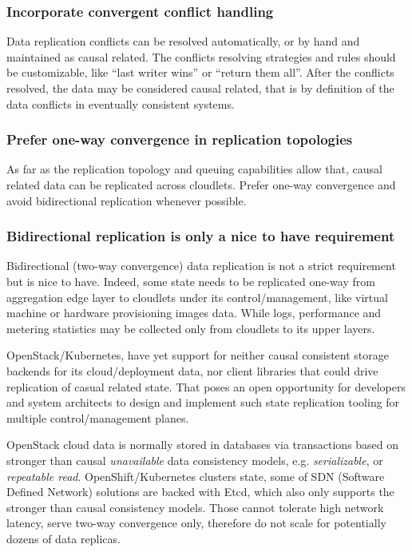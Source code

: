 \documentclass[conference]{IEEEtran}
\begin{document}
\subsubsection{Incorporate convergent conflict handling\cite{b1}}
Data replication conflicts can be resolved automatically, or by hand and
maintained as causal related. The conflicts resolving strategies and rules
should be customizable, like ``last writer wins'' or ``return them all''. After
the conflicts resolved, the data may be considered causal related, that is by
definition\cite{b1} of the data conflicts in eventually consistent systems.

\subsubsection{Prefer one-way convergence in replication topologies}
As far as the replication topology and queuing capabilities allow
that, causal related data can be replicated across cloudlets. Prefer one-way
convergence and avoid bidirectional replication whenever possible.

\subsubsection{Bidirectional replication is only a nice to have requirement}
Bidirectional (two-way convergence) data replication is not a strict
requirement but is nice to have. Indeed, some state needs to be replicated
one-way from aggregation edge layer to cloudlets under its control/management,
like virtual machine or hardware provisioning images data. While logs,
performance and metering statistics may be collected only from cloudlets to its
upper layers.

OpenStack/Kubernetes, have yet support for neither causal consistent storage
backends for its cloud/deployment data, nor client libraries that could drive
replication of casual related state. That poses an open opportunity for
developers and system architects to design and implement such state replication
tooling for multiple control/management planes.

OpenStack cloud data is normally stored in databases via transactions based on
stronger than causal \textit{unavailable}\cite{b4} data consistency models,
e.g. \textit{serializable}\cite{b4}, or \textit{repeatable read}\cite{b4}.
OpenShift/Kubernetes clusters state, some of SDN (Software Defined
Network) solutions are backed with Etcd, which also only supports
the stronger than causal consistency models. Those cannot tolerate high network
latency, serve two-way convergence only, therefore do not scale for potentially
dozens of data replicas.
\end{document}
